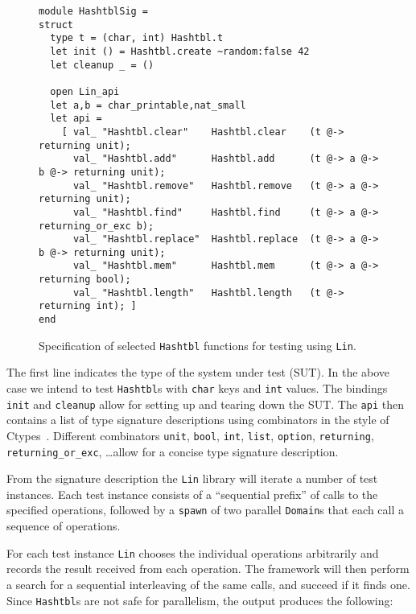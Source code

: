 \documentclass[twocolumn,10pt]{article}
\begin{document}
\begin{figure*}[htb!]
\begin{lstlisting}
module HashtblSig =
struct
  type t = (char, int) Hashtbl.t
  let init () = Hashtbl.create ~random:false 42
  let cleanup _ = ()

  open Lin_api
  let a,b = char_printable,nat_small
  let api =
    [ val_ "Hashtbl.clear"    Hashtbl.clear    (t @-> returning unit);
      val_ "Hashtbl.add"      Hashtbl.add      (t @-> a @-> b @-> returning unit);
      val_ "Hashtbl.remove"   Hashtbl.remove   (t @-> a @-> returning unit);
      val_ "Hashtbl.find"     Hashtbl.find     (t @-> a @-> returning_or_exc b);
      val_ "Hashtbl.replace"  Hashtbl.replace  (t @-> a @-> b @-> returning unit);
      val_ "Hashtbl.mem"      Hashtbl.mem      (t @-> a @-> returning bool);
      val_ "Hashtbl.length"   Hashtbl.length   (t @-> returning int); ]
end
\end{lstlisting}%
\vspace{-5mm}
\caption{Specification of selected \texttt{Hashtbl} functions for testing using
  \texttt{Lin}.}\label{code:lin}
\vspace{-.7em}%
\end{figure*}

The first line indicates the type of the system under test (SUT). In the
above case we intend to test \texttt{Hashtbl}s with \texttt{char} keys and \texttt{int}
values. The bindings \texttt{init} and \texttt{cleanup} allow for setting up and
tearing down the SUT. The \texttt{api} then contains a list of type signature
descriptions using combinators in the style of Ctypes~\cite{YALLOP201882}. Different
combinators \texttt{unit}, \texttt{bool}, \texttt{int}, \texttt{list}, \texttt{option}, \texttt{returning},
\lstinline|returning_or_exc|, \dots\@ allow for a concise type signature description.

From the signature description the \texttt{Lin} library will iterate a number of
test instances. Each test instance consists of a ``sequential prefix''
of calls to the specified operations, followed by a \texttt{spawn} of two
parallel \texttt{Domain}s that each call a sequence of operations.

For each test instance \texttt{Lin} chooses the individual operations
arbitrarily and records the result received from each operation. The
framework will then perform a search for a sequential interleaving of
the same calls, and succeed if it finds one. Since \texttt{Hashtbl}s are not
safe for parallelism, the output produces the following:
\end{document}

